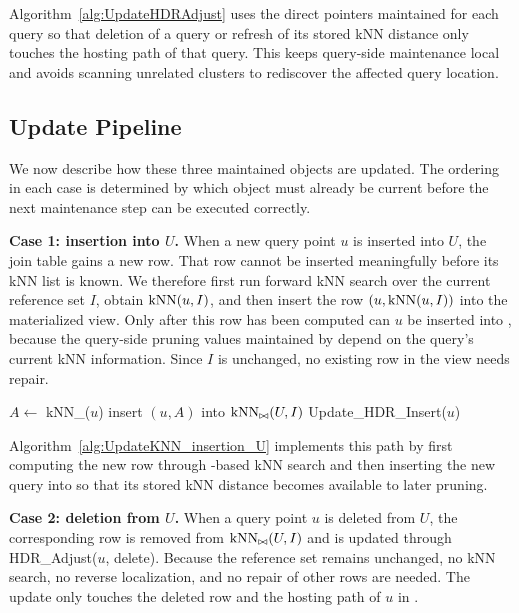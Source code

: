 Algorithm~\ref{alg:UpdateHDRAdjust} uses the direct pointers maintained for each query so that deletion of a query or refresh of its stored kNN distance only touches the hosting path of that query. This keeps query-side maintenance local and avoids scanning unrelated clusters to rediscover the affected query location.

\subsection{Update Pipeline}
\label{subsec:pipeline}

We now describe how these three maintained objects are updated. The ordering in each case is determined by which object must already be current before the next maintenance step can be executed correctly.

\noindent \textbf{Case 1: insertion into $U$.}
When a new query point $u$ is inserted into $U$, the join table gains a new row. That row cannot be inserted meaningfully before its kNN list is known. We therefore first run forward kNN search over the current reference set $I$, obtain $\operatorname{kNN}(u,I)$, and then insert the row $(u,\operatorname{kNN}(u,I))$ into the materialized view. Only after this row has been computed can $u$ be inserted into \hdrtree, because the query-side pruning values maintained by \hdrtree depend on the query's current kNN information. Since $I$ is unchanged, no existing row in the view needs repair.

\begin{algorithm}[t]
\caption{$\knnjoin$\_Insertion\_U($u$)}
\label{alg:UpdateKNN_insertion_U}
$A\leftarrow$ kNN\_\dualtree($u$)\;
insert $(u,A)$ into $\operatorname{kNN}_{\bowtie}(U,I)$\;
Update\_HDR\_Insert($u$)\;
\end{algorithm}

Algorithm~\ref{alg:UpdateKNN_insertion_U} implements this path by first computing the new row through \deltatree-based kNN search and then inserting the new query into \hdrtree so that its stored kNN distance becomes available to later pruning.

\noindent \textbf{Case 2: deletion from $U$.}
When a query point $u$ is deleted from $U$, the corresponding row is removed from $\operatorname{kNN}_{\bowtie}(U,I)$ and \hdrtree is updated through HDR\_Adjust($u$, delete). Because the reference set remains unchanged, no kNN search, no reverse localization, and no repair of other rows are needed. The update only touches the deleted row and the hosting path of $u$ in \hdrtree.

